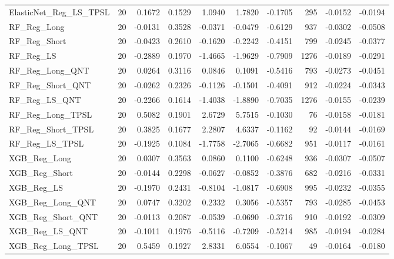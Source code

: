 \begin{tabular}{llrrrrrrrr}
\cline{1-10}
ElasticNet\_Reg\_LS\_TPSL & 20 & 0.1672 & 0.1529 & 1.0940 & 1.7820 & -0.1705 & 295 & -0.0152 & -0.0194 \\
\cline{1-10}
RF\_Reg\_Long & 20 & -0.0131 & 0.3528 & -0.0371 & -0.0479 & -0.6129 & 937 & -0.0302 & -0.0508 \\
\cline{1-10}
RF\_Reg\_Short & 20 & -0.0423 & 0.2610 & -0.1620 & -0.2242 & -0.4151 & 799 & -0.0245 & -0.0377 \\
\cline{1-10}
RF\_Reg\_LS & 20 & -0.2889 & 0.1970 & -1.4665 & -1.9629 & -0.7909 & 1276 & -0.0189 & -0.0291 \\
\cline{1-10}
RF\_Reg\_Long\_QNT & 20 & 0.0264 & 0.3116 & 0.0846 & 0.1091 & -0.5416 & 793 & -0.0273 & -0.0451 \\
\cline{1-10}
RF\_Reg\_Short\_QNT & 20 & -0.0262 & 0.2326 & -0.1126 & -0.1501 & -0.4091 & 912 & -0.0224 & -0.0343 \\
\cline{1-10}
RF\_Reg\_LS\_QNT & 20 & -0.2266 & 0.1614 & -1.4038 & -1.8890 & -0.7035 & 1276 & -0.0155 & -0.0239 \\
\cline{1-10}
RF\_Reg\_Long\_TPSL & 20 & 0.5082 & 0.1901 & 2.6729 & 5.7515 & -0.1030 & 76 & -0.0158 & -0.0181 \\
\cline{1-10}
RF\_Reg\_Short\_TPSL & 20 & 0.3825 & 0.1677 & 2.2807 & 4.6337 & -0.1162 & 92 & -0.0144 & -0.0169 \\
\cline{1-10}
RF\_Reg\_LS\_TPSL & 20 & -0.1925 & 0.1084 & -1.7758 & -2.7065 & -0.6682 & 951 & -0.0117 & -0.0161 \\
\cline{1-10}
XGB\_Reg\_Long & 20 & 0.0307 & 0.3563 & 0.0860 & 0.1100 & -0.6248 & 936 & -0.0307 & -0.0507 \\
\cline{1-10}
XGB\_Reg\_Short & 20 & -0.0144 & 0.2298 & -0.0627 & -0.0852 & -0.3876 & 682 & -0.0216 & -0.0331 \\
\cline{1-10}
XGB\_Reg\_LS & 20 & -0.1970 & 0.2431 & -0.8104 & -1.0817 & -0.6908 & 995 & -0.0232 & -0.0355 \\
\cline{1-10}
XGB\_Reg\_Long\_QNT & 20 & 0.0747 & 0.3202 & 0.2332 & 0.3056 & -0.5357 & 793 & -0.0285 & -0.0453 \\
\cline{1-10}
XGB\_Reg\_Short\_QNT & 20 & -0.0113 & 0.2087 & -0.0539 & -0.0690 & -0.3716 & 910 & -0.0192 & -0.0309 \\
\cline{1-10}
XGB\_Reg\_LS\_QNT & 20 & -0.1011 & 0.1976 & -0.5116 & -0.7209 & -0.5214 & 985 & -0.0194 & -0.0284 \\
\cline{1-10}
XGB\_Reg\_Long\_TPSL & 20 & 0.5459 & 0.1927 & 2.8331 & 6.0554 & -0.1067 & 49 & -0.0164 & -0.0180 \\
\cline{1-10}

\end{tabular}
